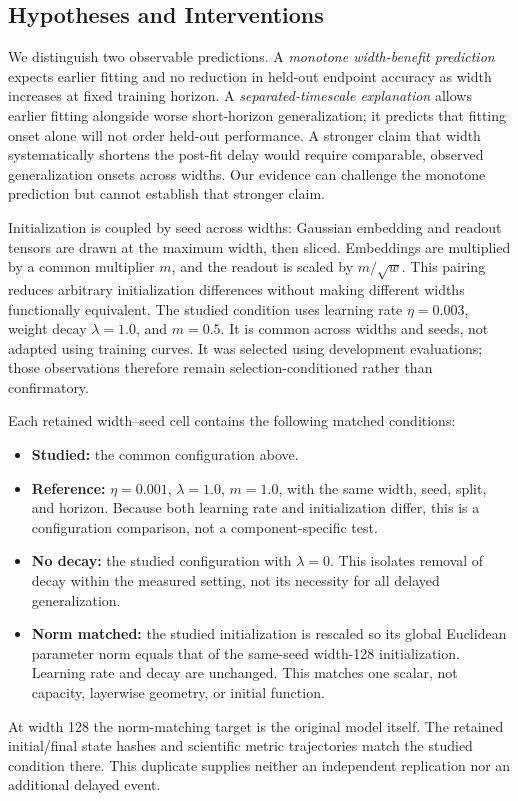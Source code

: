 \documentclass{article}
\begin{document}
\subsection{Hypotheses and Interventions}
We distinguish two observable predictions. A \emph{monotone width-benefit prediction} expects earlier fitting and no reduction in held-out endpoint accuracy as width increases at fixed training horizon. A \emph{separated-timescale explanation} allows earlier fitting alongside worse short-horizon generalization; it predicts that fitting onset alone will not order held-out performance. A stronger claim that width systematically shortens the post-fit delay would require comparable, observed generalization onsets across widths. Our evidence can challenge the monotone prediction but cannot establish that stronger claim.

Initialization is coupled by seed across widths: Gaussian embedding and readout tensors are drawn at the maximum width, then sliced. Embeddings are multiplied by a common multiplier $m$, and the readout is scaled by $m/\sqrt{w}$. This pairing reduces arbitrary initialization differences without making different widths functionally equivalent. The studied condition uses learning rate $\eta=0.003$, weight decay $\lambda=1.0$, and $m=0.5$. It is common across widths and seeds, not adapted using training curves. It was selected using development evaluations; those observations therefore remain selection-conditioned rather than confirmatory.

Each retained width--seed cell contains the following matched conditions:
\begin{itemize}
\item \textbf{Studied:} the common configuration above.
\item \textbf{Reference:} $\eta=0.001$, $\lambda=1.0$, $m=1.0$, with the same width, seed, split, and horizon. Because both learning rate and initialization differ, this is a configuration comparison, not a component-specific test.
\item \textbf{No decay:} the studied configuration with $\lambda=0$. This isolates removal of decay within the measured setting, not its necessity for all delayed generalization.
\item \textbf{Norm matched:} the studied initialization is rescaled so its global Euclidean parameter norm equals that of the same-seed width-128 initialization. Learning rate and decay are unchanged. This matches one scalar, not capacity, layerwise geometry, or initial function.
\end{itemize}
At width 128 the norm-matching target is the original model itself. The retained initial/final state hashes and scientific metric trajectories match the studied condition there. This duplicate supplies neither an independent replication nor an additional delayed event.
\end{document}
